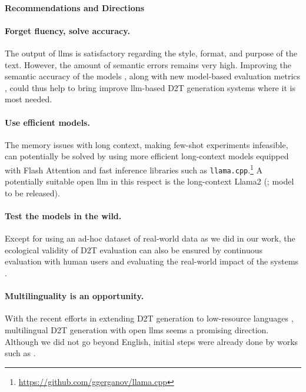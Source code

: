 \paragraph{Recommendations and Directions}
\label{sec:future}
\paragraph{Forget fluency, solve accuracy.} The output of \acp{llm} is satisfactory regarding the style, format, and purpose of the text. However, the amount of semantic errors remains very high. Improving the semantic accuracy of the models
\cite{li2022faithfulness}, along with new model-based evaluation metrics \cite{liuGEvalNLGEvaluation2023,xuINSTRUCTSCOREExplainableText2023}, could thus help to bring improve \ac{llm}-based D2T generation systems where it is most needed.



\paragraph{Use efficient models.} The memory issues with long context, making few-shot experiments infeasible, can potentially be solved by using more efficient long-context models equipped with Flash Attention \cite{dao2022flashattention} and fast inference libraries such as \texttt{llama.cpp}.\footnote{\url{https://github.com/ggerganov/llama.cpp}} A potentially suitable open \ac{llm} in this respect is the long-context Llama2 (\citealp{xiong2023effective}; model to be released).


\paragraph{Test the models in the wild.} Except for using an ad-hoc dataset of real-world data as we did in our work, the ecological validity of D2T evaluation can also be ensured by continuous evaluation with human users \cite{zheng2023judging} and evaluating the real-world impact of the systems \cite{reiter2023impact}.


\paragraph{Multilinguality is an opportunity.}With the recent efforts in extending D2T generation to low-resource languages \cite{cripwell-etal-2023-2023}, multilingual D2T generation with open \acp{llm} seems a promising direction. Although we did not go beyond English, initial steps were already done by works such as \citet{lorandi2023data}.


